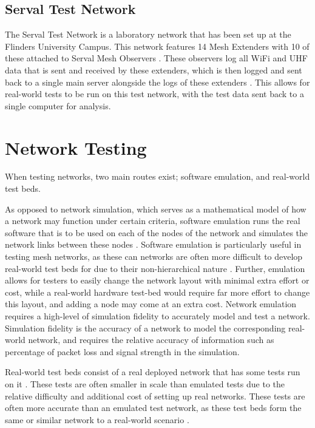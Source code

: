 \subsection{Serval Test Network}
The Serval Test Network is a laboratory network that has been set up at the Flinders University Campus.
This network features 14 Mesh Extenders with 10 of these attached to Serval Mesh Observers \parencite{wade_2019}.
These observers log all WiFi and UHF data that is sent and received by these extenders, which is then logged and sent back to a single main server alongside the logs of these extenders \parencite{lancaster_2019}.
This allows for real-world tests to be run on this test network, with the test data sent back to a single computer for analysis.


\section{Network Testing}
When testing networks, two main routes exist; software emulation, and real-world test beds.

As opposed to network simulation, which serves as a mathematical model of how a network may function under certain criteria, software emulation runs the real software that is to be used on each of the nodes of the network and simulates the network links between these nodes \parencite{comparingSimulationTestbeds}.
Software emulation is particularly useful in testing mesh networks, as these can networks are often more difficult to develop real-world test beds for due to their non-hierarchical nature \parencite{predeploymentTesting2006}.
Further, emulation allows for testers to easily change the network layout with minimal extra effort or cost, while a real-world hardware test-bed would require far more effort to change this layout, and adding a node may come at an extra cost.
Network emulation requires a high-level of simulation fidelity to accurately model and test a network.
Simulation fidelity is the accuracy of a network to model the corresponding real-world network, and requires the relative accuracy of information such as percentage of packet loss and signal strength in the simulation.

Real-world test beds consist of a real deployed network that has some tests run on it \parencite{testingWirelessMesh2010}.
These tests are often smaller in scale than emulated tests due to the relative difficulty and additional cost of setting up real networks.
These tests are often more accurate than an emulated test network, as these test beds form the same or similar network to a real-world scenario \parencite{disasterResilientMesh2013}.



